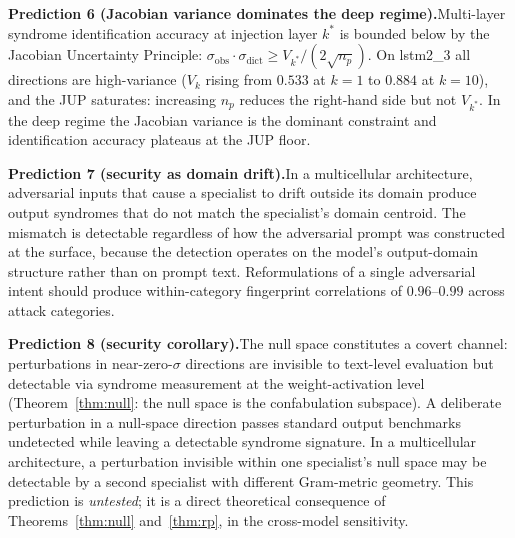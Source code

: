 \documentclass[11pt,a4paper]{article}
\begin{document}
\begin{mdframed}[backgroundcolor=insightbg, linecolor=insightcol, linewidth=1pt]
\textbf{Prediction 6 (Jacobian variance dominates the deep regime).}\quad Multi-layer syndrome identification accuracy at injection layer $k^*$ is bounded below by the Jacobian Uncertainty Principle: $\sigma_{\mathrm{obs}} \cdot \sigma_{\mathrm{dict}} \geq V_{k^*} / (2\sqrt{n_p})$. On lstm2\_3 all directions are high-variance ($V_k$ rising from $0.533$ at $k = 1$ to $0.884$ at $k = 10$), and the JUP saturates: increasing $n_p$ reduces the right-hand side but not $V_{k^*}$. In the deep regime the Jacobian variance is the dominant constraint and identification accuracy plateaus at the JUP floor.
\end{mdframed}

\begin{mdframed}[backgroundcolor=mode3bg, linecolor=mode3col, linewidth=1pt]
\textbf{Prediction 7 (security as domain drift).}\quad In a multicellular architecture, adversarial inputs that cause a specialist to drift outside its domain produce output syndromes that do not match the specialist's domain centroid. The mismatch is detectable regardless of how the adversarial prompt was constructed at the surface, because the detection operates on the model's output-domain structure rather than on prompt text. Reformulations of a single adversarial intent should produce within-category fingerprint correlations of $0.96$--$0.99$ across attack categories.
\end{mdframed}

\begin{mdframed}[backgroundcolor=insightbg, linecolor=insightcol, linewidth=1pt]
\textbf{Prediction 8 (security corollary).}\quad The null space constitutes a covert channel: perturbations in near-zero-$\sigma$ directions are invisible to text-level evaluation but detectable via syndrome measurement at the weight-activation level (Theorem~\ref{thm:null}: the null space is the confabulation subspace). A deliberate perturbation in a null-space direction passes standard output benchmarks undetected while leaving a detectable syndrome signature. In a multicellular architecture, a perturbation invisible within one specialist's null space may be detectable by a second specialist with different Gram-metric geometry. This prediction is \emph{untested}; it is a direct theoretical consequence of Theorems~\ref{thm:null} and~\ref{thm:rp}, in the cross-model sensitivity.
\end{mdframed}
\end{document}
